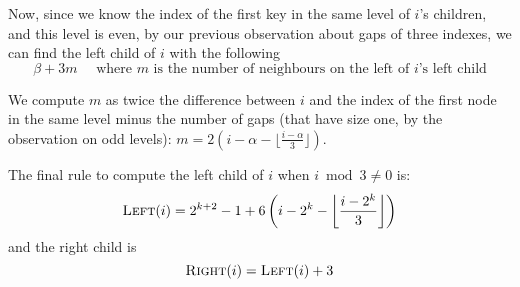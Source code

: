 Now, since we know the index of the first key in the same level of $i$'s children, and this level is even, by our previous observation about gaps of three indexes, we can find the left child of $i$ with the following $$\beta+3m \quad \text{ where $m$ is the number of neighbours on the left of $i$'s left child}$$

We compute $m$ as twice the difference between $i$ and the index of the first node in the same level minus the number of gaps (that have size one, by the observation on odd levels): $m=2(i-\alpha-\lfloor \frac{i-\alpha}{3} \rfloor)$.

The final rule to compute the left child of $i$ when $i \bmod 3 \neq 0$ is: $$\textsc{Left}(i)=2^{k+2}-1+6\left(i-2^k- \left\lfloor \frac{i-2^k}{3} \right\rfloor\right)$$ and the right child is $$\textsc{Right}(i)=\textsc{Left}(i)+3$$

\vspace{0.5cm}

